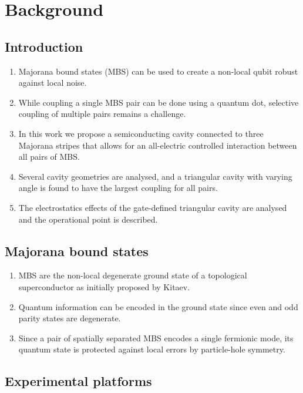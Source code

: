 \chapter{Background}

\section{Introduction}
\begin{enumerate}
\item Majorana bound states (MBS) can be used to create a non-local qubit robust against local noise.
\item While coupling a single MBS pair can be done using a quantum dot, selective coupling of multiple pairs remains a challenge.
\item In this work we propose a semiconducting cavity connected to three Majorana stripes that allows for an all-electric controlled interaction between all pairs of MBS.
\item Several cavity geometries are analysed, and a triangular cavity with varying angle is found to have the largest coupling for all pairs.
\item The electrostatics effects of the gate-defined triangular cavity are analysed and the operational point is described.
\end{enumerate}

\section{Majorana bound states}

\begin{enumerate}
\item MBS are the non-local degenerate ground state of a topological superconductor as initially proposed by Kitaev.
\item Quantum information can be encoded in the ground state since even and odd parity states are degenerate.
\item Since a pair of spatially separated MBS encodes a single fermionic mode, its quantum state is protected against local errors by particle-hole symmetry.
\end{enumerate}

\section{Experimental platforms}


